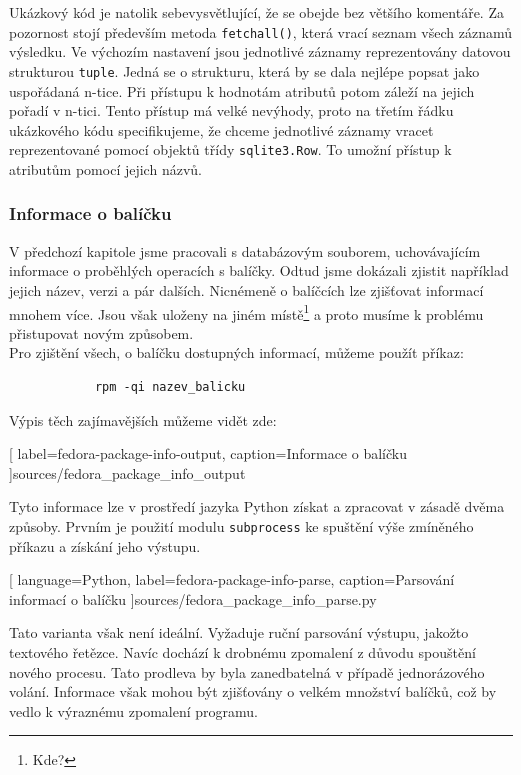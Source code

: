 \documentclass[
  field=inf,
  biblatex,
  glossaries,
  index
]{kidiplom}
\begin{document}
		Ukázkový kód je natolik sebevysvětlující, že se obejde bez většího komentáře. Za pozornost stojí především metoda \texttt{fetchall()}, která vrací seznam všech záznamů výsledku. Ve výchozím nastavení jsou jednotlivé záznamy reprezentovány datovou strukturou \texttt{tuple}. Jedná se o strukturu, která by se dala nejlépe popsat jako uspořádaná n-tice. Při přístupu k hodnotám atributů potom záleží na jejich pořadí v n-tici. Tento přístup má velké nevýhody, proto na třetím řádku ukázkového kódu specifikujeme, že chceme jednotlivé záznamy vracet reprezentované pomocí objektů třídy \texttt{sqlite3.Row}. To umožní přístup k atributům pomocí jejich názvů.

		\pagebreak
		\subsubsection{Informace o balíčku}
		V předchozí kapitole jsme pracovali s databázovým souborem, uchovávajícím informace o proběhlých operacích s balíčky. Odtud jsme dokázali zjistit například jejich název, verzi a pár dalších. Nicnémeně o balíčcích lze zjišťovat informací mnohem více. Jsou však uloženy na jiném místě\footnote{Kde?} a proto musíme k problému přistupovat novým způsobem.
		\\
		Pro zjištění všech, o balíčku dostupných informací, můžeme použít příkaz:

		\begin{lstlisting}
			rpm -qi nazev_balicku
		\end{lstlisting}

		Výpis těch zajímavějších můžeme vidět zde:
		
		[
			label=fedora-package-info-output,
			caption={Informace o balíčku}
		]{sources/fedora_package_info_output}

		Tyto informace lze v prostředí jazyka Python získat a zpracovat v zásadě dvěma způsoby. Prvním je použití modulu \texttt{subprocess} ke spuštění výše zmíněného příkazu a získání jeho výstupu.
		
		[
			language=Python,
			label=fedora-package-info-parse,
			caption={Parsování informací o balíčku}
		]{sources/fedora_package_info_parse.py}

		Tato varianta však není ideální. Vyžaduje ruční parsování výstupu, jakožto textového řetězce. Navíc dochází k drobnému zpomalení z důvodu spouštění nového procesu. Tato prodleva by byla zanedbatelná v případě jednorázového volání. Informace však mohou být zjišťovány o velkém množství balíčků, což by vedlo k výraznému zpomalení programu.
\end{document}
